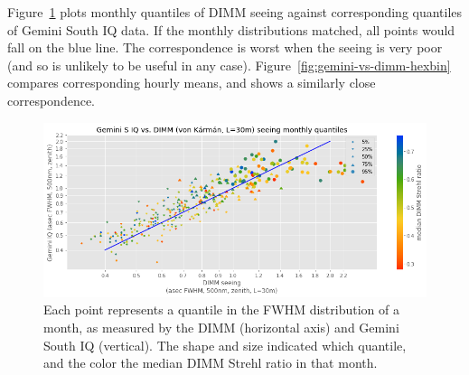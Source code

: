 \documentclass[DM,authoryear,toc]{lsstdoc}
\begin{document}

Figure~\ref{fig:gemini-vs-dimm} plots monthly quantiles of DIMM seeing
against corresponding quantiles of Gemini South IQ data. If the
monthly distributions matched, all points would fall on the blue line.
The correspondence is worst when the seeing is very poor (and so is
unlikely to be useful in any
case). Figure~\ref{fig:gemini-vs-dimm-hexbin} compares corresponding
hourly means, and shows a similarly close correspondence.

\begin{figure}
  \includegraphics[width=\columnwidth]{./figures/geminiIQ_vs_dimm.png}
  \caption{
    Each point represents a quantile in the FWHM distribution of a
    month, as measured by the DIMM (horizontal axis) and Gemini South IQ
    (vertical). The shape and size indicated which quantile, and the
    color the median DIMM Strehl ratio in that month.
    }
  \label{fig:gemini-vs-dimm}
\end{figure}
\end{document}
